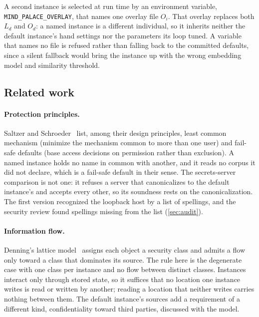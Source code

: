 \documentclass[11pt]{article}
\theoremstyle{plain}
\theoremstyle{definition}
\theoremstyle{remark}
\newcommand{\env}{\texttt{MIND\_PALACE\_OVERLAY}}
\begin{document}
A second instance is selected at run time by an environment variable, \env, that names one overlay
file $O_i$. That overlay replaces both $L_d$ and $O_d$: a named instance is a different individual,
so it inherits neither the default instance's hand settings nor the parameters its loop tuned. A
variable that names no file is refused rather than falling back to the committed defaults, since a
silent fallback would bring the instance up with the wrong embedding model and similarity
threshold.

\subsection{Related work}

\paragraph{Protection principles.} Saltzer and Schroeder~\cite{saltzer1975} list, among their design
principles, least common mechanism (minimize the mechanism common to more than one user) and
fail-safe defaults (base access decisions on permission rather than exclusion). A named instance
holds no name in common with another, and it reads no corpus it did not declare, which is a
fail-safe default in their sense. The secrets-server comparison is not one: it refuses a server
that canonicalizes to the default instance's and accepts every other, so its soundness rests on the
canonicalization. The first version recognized the loopback host by a list of spellings, and the
security review found spellings missing from the list (\cref{sec:audit}).

\paragraph{Information flow.} Denning's lattice model~\cite{denning1976} assigns each object a
security class and admits a flow only toward a class that dominates its source. The rule here is
the degenerate case with one class per instance and no flow between distinct classes. Instances
interact only through stored state, so it suffices that no location one instance writes is read or
written by another; reading a location that neither writes carries nothing between them. The
default instance's sources add a requirement of a different kind, confidentiality toward third
parties, discussed with the model.
\end{document}
